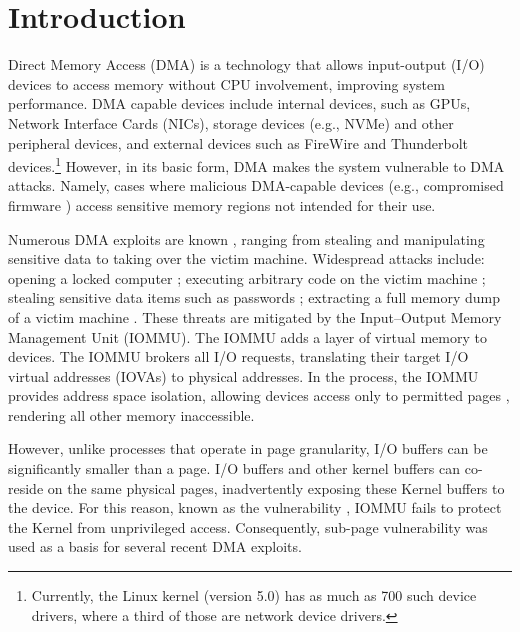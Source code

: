 \section{Introduction}

Direct Memory Access (DMA) is a technology that allows input-output (I/O) devices to access memory without CPU involvement, improving system performance.
DMA capable devices include internal devices, such as GPUs, Network Interface Cards (NICs), storage devices (e.g., NVMe) and other peripheral devices, and external devices such as FireWire and Thunderbolt devices.\footnote{Currently, the Linux kernel (version 5.0) has as much as 700 such device drivers, where a third of those are network device drivers.} However, in its basic form, DMA makes the system vulnerable to DMA attacks. Namely, cases where malicious DMA-capable devices (e.g., compromised firmware \cite{Gal14,Ben17a}) access sensitive memory regions not intended for their use. 


Numerous DMA exploits are known \cite{Dor04,BDK10,thunder}, ranging from stealing and manipulating sensitive data to taking over the victim machine. Widespread attacks include: opening a locked computer \cite{MM, Fin14}; executing arbitrary code on the victim machine \cite{Fri16, Woj08, AD10,thunder}; stealing sensitive data items such as passwords \cite{SB12, LKV13, Cim16, BR12}; extracting a full memory dump of a victim machine \cite{MM, Vol, Fin14, GA10}. These threats are mitigated by the Input–Output Memory Management Unit (IOMMU). The IOMMU adds a layer of virtual memory to devices. The IOMMU brokers all I/O requests, translating their target I/O virtual addresses (IOVAs) to physical addresses. In the process, the IOMMU provides address space isolation, allowing devices access only to permitted pages
, rendering all other memory inaccessible.

However, unlike processes that operate in page granularity, I/O buffers can be significantly smaller than a page. I/O buffers and other kernel buffers can co-reside on the same physical pages, inadvertently exposing these Kernel buffers to the device. For this reason, known as the \subpage{} vulnerability \cite{MMT16,thunder}, IOMMU fails to protect the Kernel from unprivileged access. Consequently, sub-page vulnerability was used as a basis for several recent DMA exploits. 


